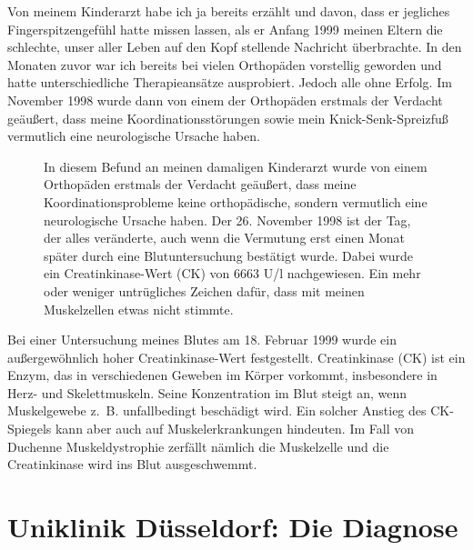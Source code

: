 \documentclass[fontsize=14pt,a4paper,headinclude,DIV=calc,automark]{scrbook}
\begin{document}
Von meinem Kinderarzt habe ich ja bereits erzählt und davon, dass er jegliches Fingerspitzengefühl hatte missen lassen, als er Anfang 1999 meinen Eltern die schlechte, unser aller Leben auf den Kopf stellende Nachricht überbrachte. In den Monaten zuvor war ich bereits bei vielen Orthopäden vorstellig geworden und hatte unterschiedliche Therapieansätze ausprobiert. Jedoch alle ohne Erfolg. Im November 1998 wurde dann von einem der Orthopäden erstmals der Verdacht geäußert, dass meine Koordinationsstörungen sowie mein Knick-Senk-Spreizfuß vermutlich eine neurologische Ursache haben.

\setlength{\fboxsep}{0pt}    %
\setlength{\fboxrule}{0.2pt} %
\begin{figure}[H]
    \centering
    \caption{In diesem Befund an meinen damaligen Kinderarzt wurde von einem Orthopäden erstmals der Verdacht geäußert, dass meine Koordinationsprobleme keine orthopädische, sondern vermutlich eine neurologische Ursache haben. Der 26. November 1998 ist der Tag, der alles veränderte, auch wenn die Vermutung erst einen Monat später durch eine Blutuntersuchung bestätigt wurde. Dabei wurde ein Creatinkinase-Wert (CK) von 6663 U/l nachgewiesen. Ein mehr oder weniger untrügliches Zeichen dafür, dass mit meinen Muskelzellen etwas nicht stimmte.}
    \label{fig:befund}
\end{figure}

Bei einer Untersuchung meines Blutes am 18. Februar 1999 wurde ein außergewöhnlich hoher Creatinkinase-Wert festgestellt. Creatinkinase (CK) ist ein Enzym, das in verschiedenen Geweben im Körper vorkommt, insbesondere in Herz- und Skelettmuskeln. Seine Konzentration im Blut steigt an, wenn Muskelgewebe z.~B. unfallbedingt beschädigt wird. Ein solcher Anstieg des CK-Spiegels kann aber auch auf Muskelerkrankungen hindeuten. Im Fall von Duchenne Muskeldystrophie zerfällt nämlich die Muskelzelle und die Creatinkinase wird ins Blut ausgeschwemmt.

\section{Uniklinik Düsseldorf: Die Diagnose}
\end{document}
